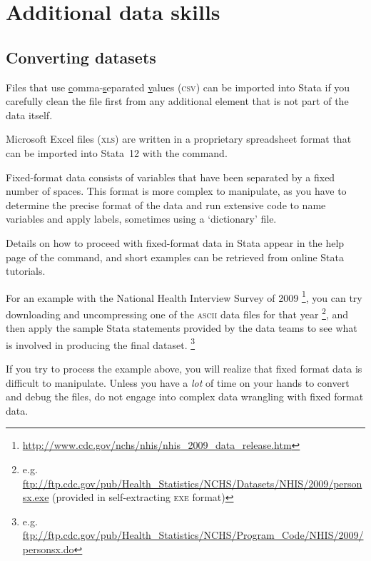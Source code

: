 %
%
\section{Additional data skills}
\label{sec:additional-data-skills}

%
\subsection{Converting datasets}
\label{sec:data-conversion}

\label{sec:insheet}

Files that use \underline{c}omma-\underline{s}eparated \underline{v}alues (\textsc{csv}) can be imported into Stata if you carefully clean the file first from any additional element that is not part of the data itself.

\label{sec:import-excel}

Microsoft Excel files (\textsc{xls}) are written in a proprietary spreadsheet format that can be imported into Stata~12 with the  command.

\label{sec:infix}

Fixed-format data consists of variables that have been separated by a fixed number of spaces. This format is more complex to manipulate, as you have to determine the precise format of the data and run extensive code to name variables and apply labels, sometimes using a `dictionary' file.
    
Details on how to proceed with fixed-format data in Stata appear in the help page of the  command, and short examples can be retrieved from online Stata tutorials.
    
For an example with the National Health Interview Survey of 2009%
\footnote{\url{http://www.cdc.gov/nchs/nhis/nhis_2009_data_release.htm}}, %
you can try downloading and uncompressing one of the \textsc{ascii} data files for that year%
\footnote{e.g. \url{ftp://ftp.cdc.gov/pub/Health_Statistics/NCHS/Datasets/NHIS/2009/personsx.exe} (provided in self-extracting \textsc{exe} format)}, %
and then apply the sample Stata statements provided by the data teams to see what is involved in producing the final dataset.%
\footnote{e.g. \url{ftp://ftp.cdc.gov/pub/Health_Statistics/NCHS/Program_Code/NHIS/2009/personsx.do}}
    
    If you try to process the example above, you will realize that fixed format data is difficult to manipulate. %
    Unless you have a \emph{lot} of time on your hands to convert and debug the files, do not engage into complex data wrangling with fixed format data.


